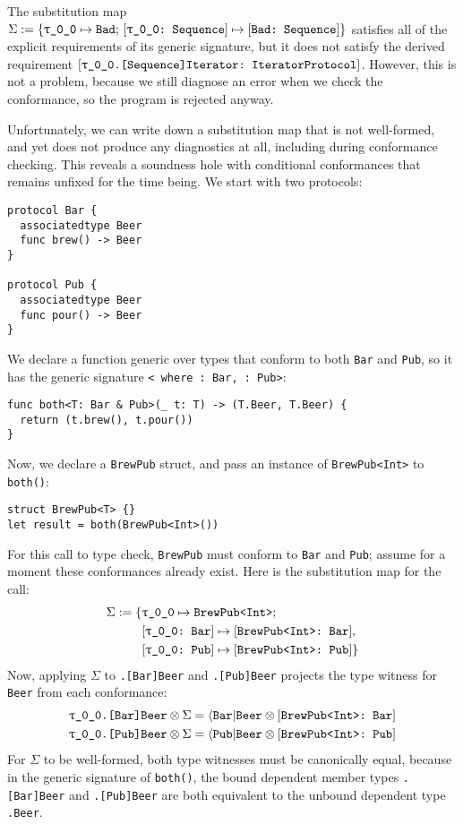 \documentclass[../generics]{subfiles}
\begin{document}
The substitution map
$\Sigma:=\SubstMapC{\SubstType{\rT}{Bad}}{\SubstConf{\rT}{Bad}{Sequence}}$ satisfies all of the explicit requirements of its generic signature, but it does not satisfy the derived requirement $\ConfReq{\rT.[Sequence]Iterator}{IteratorProtocol}$. However, this is not a problem, because we still diagnose an error when we check the conformance, so the program is rejected anyway.

Unfortunately, we can write down a substitution map that is not well-formed, and yet  does not produce any diagnostics at all, including during conformance checking. This reveals a soundness hole with conditional conformances that remains unfixed for the time being. We start with two protocols:
\begin{Verbatim}
protocol Bar {
  associatedtype Beer
  func brew() -> Beer
}

protocol Pub {
  associatedtype Beer
  func pour() -> Beer
}
\end{Verbatim}
We declare a function generic over types that conform to both \texttt{Bar} and \texttt{Pub}, so it has the generic signature \texttt{<\rT\ where \rT:~Bar, \rT:~Pub>}:
\begin{Verbatim}
func both<T: Bar & Pub>(_ t: T) -> (T.Beer, T.Beer) {
  return (t.brew(), t.pour())
}
\end{Verbatim}
Now, we declare a \texttt{BrewPub} struct, and pass an instance of \texttt{BrewPub<Int>} to \texttt{both()}:
\begin{Verbatim}
struct BrewPub<T> {}
let result = both(BrewPub<Int>())
\end{Verbatim}
For this call to type check, \texttt{BrewPub} must conform to \texttt{Bar} and \texttt{Pub}; assume for a moment these conformances already exist. Here is the substitution map for the call:
\begin{align*}
\Sigma := \SubstMapC{
&\SubstType{\rT}{BrewPub<Int>}}{\\
&\SubstConf{\rT}{BrewPub<Int>}{Bar},\\
&\SubstConf{\rT}{BrewPub<Int>}{Pub}
}
\end{align*}
Now, applying $\Sigma$ to \texttt{\rT.[Bar]Beer} and \texttt{\rT.[Pub]Beer} projects the type witness for \texttt{Beer} from each conformance:
\begin{gather*}
\texttt{\rT.[Bar]Beer}\otimes\Sigma = \AssocType{Bar}{Beer}\otimes\ConfReq{BrewPub<Int>}{Bar}\\
\texttt{\rT.[Pub]Beer}\otimes\Sigma = \AssocType{Pub}{Beer}\otimes\ConfReq{BrewPub<Int>}{Pub}
\end{gather*}
For $\Sigma$ to be well-formed, both type witnesses must be canonically equal, because in the generic signature of \texttt{both()}, the bound dependent member types \texttt{\rT.[Bar]Beer} and \texttt{\rT.[Pub]Beer} are both equivalent to the unbound dependent type \texttt{\rT.Beer}.
\end{document}
